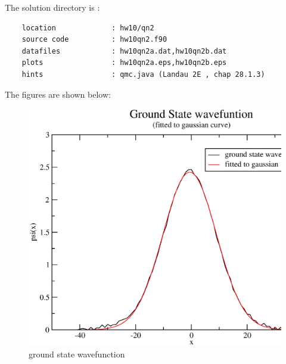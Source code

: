 \documentclass[11pt,a4paper,english]{article}
\begin{document}
		The solution directory is :\\
	\begin{verbatim}
	location             : hw10/qn2
	source code          : hw10qn2.f90
	datafiles            : hw10qn2a.dat,hw10qn2b.dat
	plots                : hw10qn2a.eps,hw10qn2b.eps	
	hints                : qmc.java (Landau 2E , chap 28.1.3) 
	\end{verbatim}

     The figures are shown below:\\
	\begin{figure}[h!]
	\centering
	\includegraphics [scale=0.6]{figures/hw10qn2a.eps}
	\caption{ground state wavefunction }
	\end{figure}
	\clearpage
	
\end{document}
